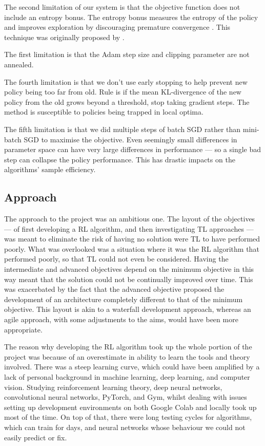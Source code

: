 \documentclass[12pt,a4paper]{article}
\begin{document}
The second limitation of our system is that the objective function does not include an entropy bonus. The entropy bonus measures the entropy of the policy and improves exploration by discouraging premature convergence \cite{mnih2016asynchronous}. This technique was originally proposed by \cite{article2}.  

The first limitation is that the Adam step size and clipping parameter are not annealed.

The fourth limitation is that we don't use early stopping to help prevent new policy being too far from old. Rule is if the mean KL-divergence of the new policy from the old grows beyond a threshold, stop taking gradient steps. The method is susceptible to policies being trapped in local optima.

The fifth limitation is that we did multiple steps of batch SGD rather than mini-batch SGD to maximise the objective. Even seemingly small differences in parameter space can have very large differences in performance --- so a single bad step can collapse the policy performance. This has drastic impacts on the algorithms' sample efficiency.

\subsection{Approach}
The approach to the project was an ambitious one. The layout of the objectives --- of first developing a RL algorithm, and then investigating TL approaches --- was meant to eliminate the risk of having no solution were TL to have performed poorly. What was overlooked was a situation where it was the RL algorithm that performed poorly, so that TL could not even be considered. Having the intermediate and advanced objectives depend on the minimum objective in this way meant that the solution could not be continually improved over time. This was exacerbated by the fact that the advanced objective proposed the development of an architecture completely different to that of the minimum objective. This layout is akin to a waterfall development approach, whereas an agile approach, with some adjustments to the aims, would have been more appropriate. 

The reason why developing the RL algorithm took up the whole portion of the project was because of an overestimate in ability to learn the tools and theory involved. There was a steep learning curve, which could have been amplified by a lack of personal background in machine learning, deep learning, and computer vision. Studying reinforcement learning theory, deep neural networks, convolutional neural networks, PyTorch, and Gym, whilst dealing with issues setting up development environments on both Google Colab and locally took up most of the time. On top of that, there were long testing cycles for algorithms, which can train for days, and neural networks whose behaviour we could not easily predict or fix.
\end{document}
